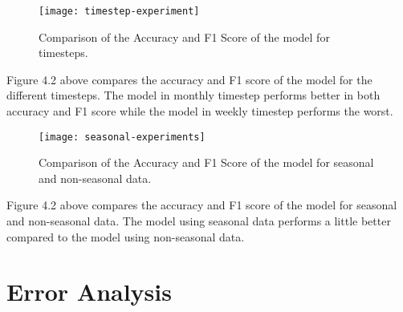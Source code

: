     \begin{figure}[H]
    \centering
    \texttt{[image: timestep-experiment]}
    \caption{Comparison of the Accuracy and F1 Score of the model for timesteps.}
    \end{figure}
    Figure 4.2 above compares the accuracy and F1 score of the model for the different timesteps. The model in monthly timestep performs better in both accuracy and F1 score while the model in weekly timestep performs the worst.
    
    \begin{figure}[H]
    \centering
    \texttt{[image: seasonal-experiments]}
    \caption{Comparison of the Accuracy and F1 Score of the model for seasonal and non-seasonal data.}
    \end{figure}
    Figure 4.2 above compares the accuracy and F1 score of the model for seasonal and non-seasonal data. The model using seasonal data performs a little better compared to the model using non-seasonal data.

\section{Error Analysis}
